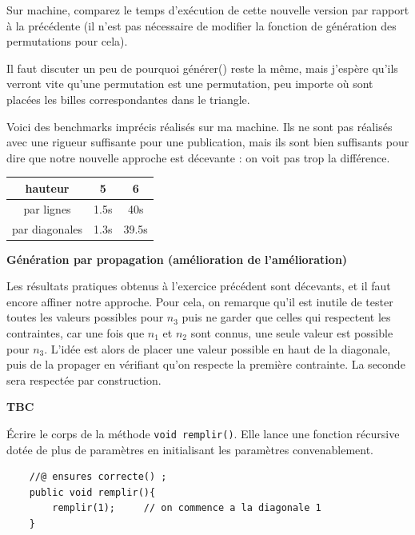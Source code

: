\documentclass[10pt]{article}\usepackage[correction,nu]{esial}
\begin{document}
  \begin{Question}
    Sur machine, comparez le temps d'exécution de cette nouvelle version par
    rapport à la précédente (il n'est pas nécessaire de modifier la fonction de
    génération des permutations pour cela).
  \end{Question}

  \begin{Reponse}
    Il faut discuter un peu de pourquoi générer() reste la même, mais j'espère
    qu'ils verront vite qu'une permutation est une permutation, peu importe où
    sont placées les billes correspondantes dans le triangle.

    Voici des benchmarks imprécis réalisés sur ma machine. Ils ne sont pas
    réalisés avec une rigueur suffisante pour une publication, mais ils sont
    bien suffisants pour dire que notre nouvelle approche est décevante : on
    voit pas trop la différence.

    \begin{tabular}{|c|c|c|}\hline
      hauteur       &5&6\\\hline
      par lignes    &1.5s&40s\\\hline
      par diagonales&1.3s&39.5s\\\hline
    \end{tabular}
  \end{Reponse}

\begin{Exercice}\textbf{Génération par propagation (amélioration de l'amélioration)}
\end{Exercice}

\noindent Les résultats pratiques obtenus à l'exercice précédent sont décevants,
et il faut encore affiner notre approche. Pour cela, on remarque qu'il est
inutile de tester toutes les valeurs possibles pour $n_3$ puis ne garder que
celles qui respectent les contraintes, car une fois que $n_1$ et $n_2$ sont
connus, une seule valeur est possible pour $n_3$. L'idée est alors de placer
une valeur possible en haut de la diagonale, puis de la propager en vérifiant
qu'on respecte la première contrainte. La seconde sera respectée par construction.

\medskip %
\textbf{TBC}

\begin{Question}
  Écrire le corps de la méthode \texttt{void remplir()}. Elle lance une
  fonction récursive dotée de plus de paramètres en initialisant les paramètres
  convenablement.
\end{Question}
\begin{Reponse}
\begin{verbatim}
    //@ ensures correcte() ;
    public void remplir(){
        remplir(1); 	// on commence a la diagonale 1
    } 
\end{verbatim}
\end{Reponse}
\end{document}
